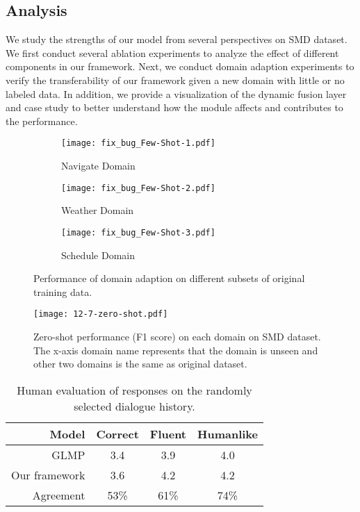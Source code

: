 \documentclass[11pt,a4paper]{article}
\begin{document}
\subsection{Analysis}
We study the strengths of our model from several perspectives on SMD dataset. We first conduct several ablation experiments to analyze the effect of different components in our framework. Next, we conduct domain adaption experiments to verify the transferability of our framework given a new domain with little or no labeled data. 
In addition, we provide a visualization of the dynamic fusion layer and case study to better understand how the module affects and contributes to the performance. 
\begin{figure*}[htbp]
	\centering
	\begin{adjustbox}{width=0.9\textwidth}
		\begin{subfigure}[t]{0.3\linewidth}
			\texttt{[image: fix\_bug\_Few-Shot-1.pdf]}
			\caption{Navigate Domain}
			\label{fig:myfig3}
		\end{subfigure}
		\quad
		\begin{subfigure}[t]{0.3\linewidth}
			\texttt{[image: fix\_bug\_Few-Shot-2.pdf]}
			\caption{Weather Domain}
			\label{fig:myfig4}
		\end{subfigure}
		\quad
		\begin{subfigure}[t]{0.3\linewidth}
			\texttt{[image: fix\_bug\_Few-Shot-3.pdf]}
			\caption{Schedule Domain}
			\label{fig:myfig5}
		\end{subfigure}
	\end{adjustbox}
	\caption{Performance of domain adaption on different subsets of original training data.}
	\label{fig:few-shot}
\end{figure*}

\begin{figure}[t]
	\centering
\texttt{[image: 12-7-zero-shot.pdf]}
	\caption{
		Zero-shot performance (F1 score) on each domain on SMD dataset.
		The x-axis domain name represents that the domain is unseen and other two domains is the same as original dataset.
	}
	\label{fig:zero-shot}
\end{figure}

\begin{table}[t]
	\centering
	\begin{adjustbox}{width=0.4\textwidth}
		\begin{tabular}{rccc}
			\hline
			Model& Correct& Fluent & Humanlike\\\hline
			GLMP & 3.4 & 3.9 & 4.0 \\
	
			Our framework & 3.6 & 4.2 & 4.2\\
			\hline
			Agreement & 53\% & 61\% & 74\%\\
			\hline
		\end{tabular}
	\end{adjustbox}
	\caption{
		Human evaluation of responses on the randomly selected dialogue history.
	}
	\label{tab:human}
\end{table}
\end{document}
